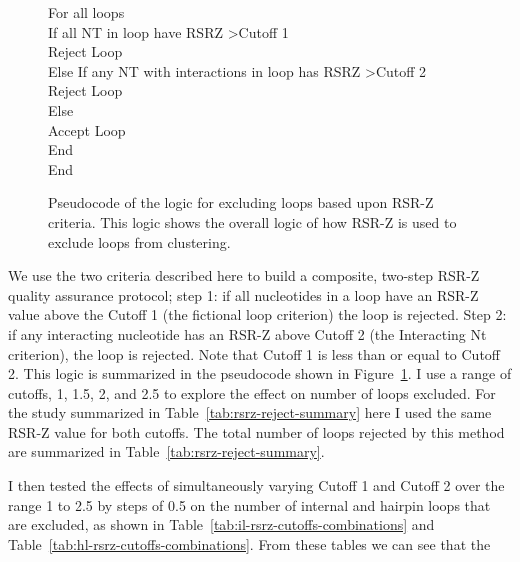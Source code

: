 \begin{figure}
  For all loops \\
    \indent If all NT in loop have RSRZ \textgreater Cutoff 1 \\
      \indent \indent Reject Loop \\
    \indent Else If any NT with interactions in loop has RSRZ \textgreater Cutoff 2 \\
      \indent \indent Reject Loop \\
    \indent Else \\
      \indent \indent Accept Loop \\
    \indent End \\
  End \\
  \caption{Pseudocode of the logic for excluding loops based upon RSR-Z
  criteria. This logic shows the overall logic of how RSR-Z is used to exclude
  loops from clustering.}
  \label{fig:pseudo-rsrz-logic}
\end{figure}

We use the two criteria described here to build a composite, two-step RSR-Z
quality assurance protocol; step 1: if all nucleotides in a loop have an RSR-Z
value above the Cutoff 1 (the fictional loop criterion) the loop is rejected.
Step 2: if any interacting nucleotide has an RSR-Z above Cutoff 2 (the
Interacting Nt criterion), the loop is rejected. Note that Cutoff 1 is less than
or equal to Cutoff 2. This logic is summarized in the pseudocode shown in
Figure~\ref{fig:pseudo-rsrz-logic}. I use a range of cutoffs, 1, 1.5, 2, and 2.5
to explore the effect on number of loops excluded. For the study summarized in
Table~\ref{tab:rsrz-reject-summary} here I used the same RSR-Z value for both
cutoffs. The total number of loops rejected by this method are summarized in
Table~\ref{tab:rsrz-reject-summary}. 


I then tested the effects of simultaneously varying Cutoff 1 and Cutoff 2 over
the range 1 to 2.5 by steps of 0.5 on the number of internal and hairpin loops
that are excluded, as shown in Table~\ref{tab:il-rsrz-cutoffs-combinations} and
Table~\ref{tab:hl-rsrz-cutoffs-combinations}. From these tables we can see that
the

